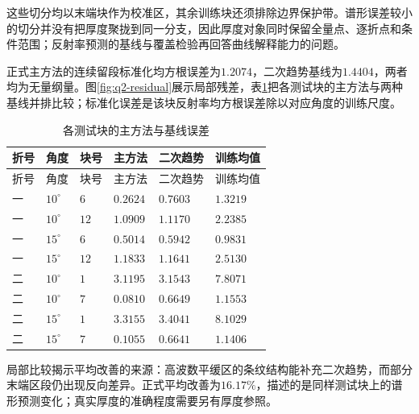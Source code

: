 这些切分均以末端块作为校准区，其余训练块还须排除边界保护带。谱形误差较小的切分并没有把厚度聚拢到同一分支，因此厚度对象同时保留全量点、逐折点和条件范围；反射率预测的基线与覆盖检验再回答曲线解释能力的问题。

正式主方法的连续留段标准化均方根误差为$1.2074$，二次趋势基线为$1.4404$，两者均为无量纲量。图\ref{fig:q2-residual}展示局部残差，表\ref{tab:q2-app-scores}把各测试块的主方法与两种基线并排比较；标准化误差是该块反射率均方根误差除以对应角度的训练尺度。

\begingroup
\small
\renewcommand{\arraystretch}{1.15}
\begin{longtable}{>{\centering\arraybackslash}p{}>{\centering\arraybackslash}p{}>{\centering\arraybackslash}p{}>{\centering\arraybackslash}p{}>{\centering\arraybackslash}p{}>{\centering\arraybackslash}p{}}
\caption{各测试块的主方法与基线误差}\label{tab:q2-app-scores}\\
\toprule
折号 & 角度 & 块号 & 主方法 & 二次趋势 & 训练均值 \\
\midrule
\endfirsthead
\toprule
折号 & 角度 & 块号 & 主方法 & 二次趋势 & 训练均值 \\
\midrule
\endhead
\bottomrule
\endfoot
一 & $10^\circ$ & $6$ & $0.2624$ & $0.7603$ & $1.3219$ \\
一 & $10^\circ$ & $12$ & $1.0909$ & $1.1170$ & $2.2385$ \\
一 & $15^\circ$ & $6$ & $0.5014$ & $0.5942$ & $0.9831$ \\
一 & $15^\circ$ & $12$ & $1.1833$ & $1.1641$ & $2.5130$ \\
二 & $10^\circ$ & $1$ & $3.1195$ & $3.1543$ & $7.8071$ \\
二 & $10^\circ$ & $7$ & $0.0810$ & $0.6649$ & $1.1553$ \\
二 & $15^\circ$ & $1$ & $3.3155$ & $3.4041$ & $8.1029$ \\
二 & $15^\circ$ & $7$ & $0.1055$ & $0.6641$ & $1.1406$ \\
\end{longtable}
\endgroup

局部比较揭示平均改善的来源：高波数平缓区的条纹结构能补充二次趋势，而部分末端区段仍出现反向差异。正式平均改善为$16.17\%$，描述的是同样测试块上的谱形预测变化；真实厚度的准确程度需要另有厚度参照。

